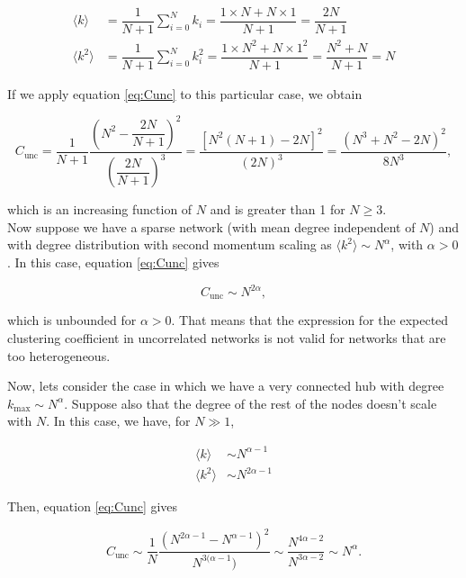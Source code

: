 \documentclass{article}
\begin{document}
\begin{align}
    \langle k \rangle &= \dfrac{1}{N+1} \sum_{i=0}^N k_i = \dfrac{1\times N + N \times 1}{N+1} = \dfrac{2N}{N+1} \nonumber \\
    \langle k^2 \rangle &= \dfrac{1}{N+1} \sum_{i=0}^N k_i^2 = \dfrac{1\times N^2 + N \times 1^2}{N+1} = \dfrac{N^2 + N}{N+1} = N
\end{align}

If we apply equation \ref{eq:Cunc} to this particular case, we obtain

\begin{equation}
    C_{\mathrm{unc}} = \dfrac{1}{N+1}\dfrac{\left(N^2-\dfrac{2N}{N+1} \right)^2}{\left(\dfrac{2N}{N+1} \right)^3}= \dfrac{\left[N^2(N+1)-2N\right]^2}{(2N)^3} = \dfrac{(N^3+N^2-2N)^2}{8N^3},
\end{equation}

which is an increasing function of $N$ and is greater than 1 for $N \geq 3$.
\\

Now suppose we have a sparse network (with mean degree independent of $N$) and with degree distribution with second momentum scaling as $\langle k^2 \rangle \sim N^{\alpha}$, with $\alpha > 0$. In this case, equation \ref{eq:Cunc} gives

\begin{equation}
    C_{\mathrm{unc}} \sim N^{2\alpha},
\end{equation}

which is unbounded for $\alpha > 0$. That means that the expression for the expected clustering coefficient in uncorrelated networks is not valid for networks that are too heterogeneous. 

Now, lets consider the case in which we have a very connected hub with degree $k_{\mathrm{max}} \sim N^{\alpha}$. Suppose also that the degree of the rest of the nodes doesn't scale with $N$. In this case, we have, for $N\gg 1$, 

\begin{align}
    \langle k \rangle &\sim N^{\alpha - 1} \nonumber \\
    \langle k^2 \rangle &\sim N^{2\alpha-1} \nonumber 
\end{align}

Then, equation \ref{eq:Cunc} gives 

\begin{equation}
    C_{\mathrm{unc}} \sim \dfrac{1}{N} \dfrac{(N^{2\alpha-1} - N^{\alpha - 1})^2}{N^{3(\alpha - 1})} \sim \dfrac{N^{4\alpha-2}}{N^{3\alpha-2}} \sim N^{\alpha}.
\end{equation}
\end{document}
